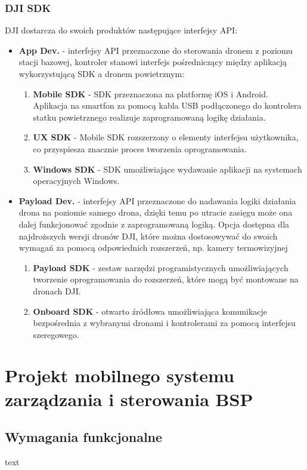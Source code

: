 \documentclass[12pt, a4paper, twoside]{report}
\begin{document}
\subsection{DJI SDK}
\hspace{1cm}DJI dostarcza do swoich produktów następujące interfejsy API:
\begin{itemize}
  \item \textbf{App Dev.} - interfejsy API przeznaczone do sterowania dronem z poziomu stacji bazowej, kontroler stanowi interfejs pośredniczący między aplikacją wykorzystującą SDK a dronem powietrznym:\begin{enumerate}
    \item \textbf{Mobile SDK} - SDK przeznaczona na platformę iOS i Android. Aplikacja na smartfon za pomocą kabla USB podłączonego do kontrolera statku powietrznego realizuje zaprogramowaną logikę działania.
    \item \textbf{UX SDK} - Mobile SDK rozszerzony o elementy interfejsu użytkownika, co przyspiesza znacznie proces tworzenia oprogramowania.
    \item \textbf{Windows SDK} - SDK umożliwiające wydawanie aplikacji na systemach operacyjnych Windows. 
  \end{enumerate}
  \item \textbf{Payload Dev.} - interfejsy API przeznaczone do nadawania logiki działania drona na poziomie samego drona, dzięki temu po utracie zasięgu może ona dalej funkcjonować zgodnie z zaprogramowaną logiką. Opcja dostępna dla najdroższych wersji dronów DJI, które można dostosowywać do swoich wymagań za pomocą odpowiednich rozszerzeń, np. kamery termowizyjnej\begin{enumerate}
    \item \textbf{Payload SDK} - zestaw narzędzi programistycznych umożliwiających tworzenie oprogramowania do rozszerzeń, które mogą być montowane na dronach DJI. 
    \item \textbf{Onboard SDK} - otwarto źródłowa umożliwiająca komunikacje bezpośrednia z wybranymi dronami i kontrolerami za pomocą interfejsu szeregowego.  
  \end{enumerate}
\end{itemize}

\chapter{Projekt mobilnego systemu zarządzania i sterowania BSP}
\section{Wymagania funkcjonalne}
\hspace{1cm}text
\end{document}
